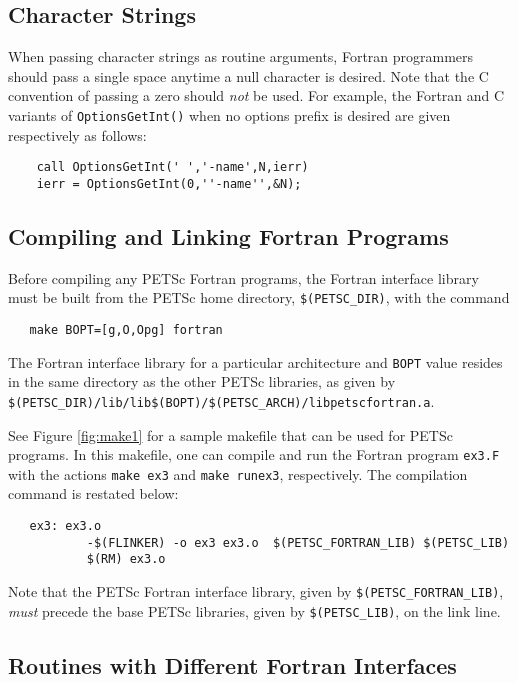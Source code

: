 \subsection{Character Strings}

When passing character strings as routine arguments, Fortran
programmers should pass a single space anytime a null character is
desired.  Note that the C convention of passing a zero should {\em not} 
be used.  For example, the Fortran and C variants of 
{\tt OptionsGetInt()} when no options prefix is desired are given
respectively as follows:
\begin{verbatim}
    call OptionsGetInt(' ','-name',N,ierr)
    ierr = OptionsGetInt(0,''-name'',&N);
\end{verbatim}

\subsection{Compiling and Linking Fortran Programs}

Before compiling any PETSc Fortran programs, the Fortran interface
library must be built from the PETSc home directory, {\tt \$(PETSC\_DIR)},
with the command
\begin{verbatim}
   make BOPT=[g,O,Opg] fortran
\end{verbatim}
The Fortran interface library  for a particular architecture and {\tt BOPT} value
resides in the same directory as the other PETSc libraries, as given by
{\tt \$(PETSC\_DIR)/lib/lib\$(BOPT)/\$(PETSC\_ARCH)/libpetscfortran.a}.

See Figure \ref{fig:make1} for a sample makefile that can be used for
PETSc programs.  In this makefile, one can compile and run the
Fortran program {\tt ex3.F} with the actions {\tt make ex3} and
{\tt make runex3}, respectively. The compilation command is restated below:
\begin{verbatim}
   ex3: ex3.o 
           -$(FLINKER) -o ex3 ex3.o  $(PETSC_FORTRAN_LIB) $(PETSC_LIB)
           $(RM) ex3.o
\end{verbatim}
Note that the PETSc Fortran interface library, given by 
{\tt \$(PETSC\_FORTRAN\_LIB)}, {\em must}   precede
the base PETSc libraries, given by {\tt \$(PETSC\_LIB)}, 
on the link line.

\subsection{Routines with Different Fortran Interfaces}
\label{sec:fortran_exceptions}

